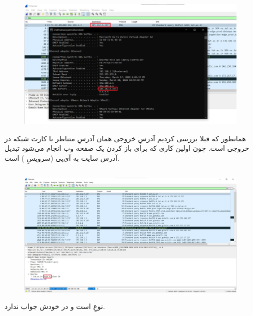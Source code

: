 \documentclass{article}
\begin{document}
\subsection{}
\begin{figure}[H]
    \centering
    \includegraphics[width=1.0\textwidth]{figures/22.jpg}
    \caption{}
    \label{fig:fig1}
\end{figure}
همانطور که قبلا بررسی کردیم آدرسِ خروجی همان آدرسِ  متناظر با کارت شبکه در خروجی  است. چون اولین کاری که برای باز کردن یک صفحه وب انجام می‌شود تبدیل آدرس سایت به آی‌پی (سرویسِ ) است.

\subsection{}
\begin{figure}[H]
    \centering
    \includegraphics[width=1.0\textwidth]{figures/54.jpg}
    \caption{}
    \label{fig:fig1}
\end{figure}
نوعِ  است و در خودش جواب ندارد.
\end{document}
